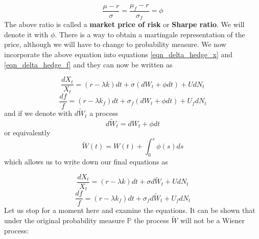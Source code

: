 \documentclass[times, utf8, diplomski]{fer}
\begin{document}
\begin{equation} \label{eqn_sharpe}
	\frac{\mu - r}{\sigma} = \frac{\mu_f - r}{\sigma_f} = \phi
\end{equation}
The above ratio is called a \textbf{market price of risk} or  \textbf{Sharpe ratio}. We will denote it with $\phi$. There is a way to obtain a martingale representation of the price, although we will have to change to probability measure. We now incorporate the above equation into equations \ref{eqn_delta_hedge_x} and \ref{eqn_delta_hedge_f} and they can now be written as

$$ \frac{dX_t}{X_t} = (r - \lambda k)dt + \sigma (dW_t + \phi dt) + UdN_t $$
$$ \frac{df}{f} = (r - \lambda k_f)dt + \sigma_f (dW_t + \phi dt) + U_fdN_t $$
and if we denote with $d\tilde{W}_t$ a process
\begin{equation}
	d\tilde{W}_t = dW_t + \phi dt
\end{equation} or equivalently
\begin{equation}
	\tilde{W}(t) = W(t) + \int_0^s \phi(s) ds
\end{equation} which allows us to write down our final equations as

\begin{equation}\label{eqn_x_new_measure}
	\frac{dX_t}{X_t} = (r - \lambda k)dt + \sigma d\tilde{W}_t + UdN_t
\end{equation}
\begin{equation}
	\frac{df}{f} = (r - \lambda k_f)dt + \sigma_f d\tilde{W}_t + U_fdN_t
\end{equation}
Let us stop for a moment here and examine the equations. It can be shown that under the original probability measure $\mathbb{P}$ the process $\tilde{W}$ will not be a Wiener process:
\end{document}
